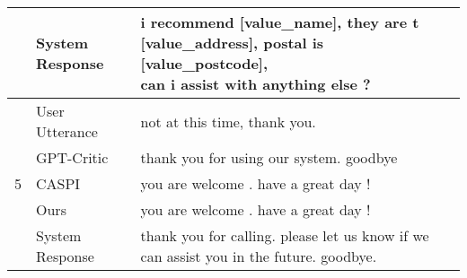 \begin{table}[H]
{\begin{tabular}{@{}cll@{}}
                   & System Response & \makecell[l]{i recommend {[}value\_name{]}, they are t {[}value\_address{]}, postal is {[}value\_postcode{]}, \\ can i assist with anything else ?}                                                                         \\ \midrule
\multirow{5}{*}{5} & User Utterance  & not at this time, thank you.                                                                                                                                                                               \\ \cmidrule(l){2-3} 
                   & GPT-Critic      & thank you for using our system. goodbye                                                                                                                                                                  \\ \cmidrule(l){2-3} 
                   & CASPI           & you are welcome . have a great day !                                                                                                                                                                       \\ \cmidrule(l){2-3} 
                   & Ours            & you are welcome . have a great day !                                                                                                                                                                       \\ \cmidrule(l){2-3} 
                   & System Response & thank you for calling. please let us know if we can assist you in the future. goodbye.                                                                                                                     \\ \bottomrule
\end{tabular}
}
\end{table}

\clearpage


